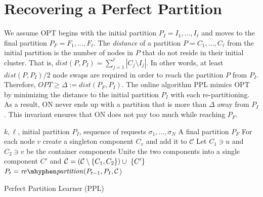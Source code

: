 \documentclass[manuscript,screen=true]{acmart}
\newcommand{\OPT}{\mathit{OPT}}
\DeclarePairedDelimiter\set{\{}{\}}
\begin{document}
\section{Recovering a Perfect Partition}	\label{sec:upperbound}
     
We assume OPT begins with the initial partition
$P_I = I_1, \dots, I_{\ell}$ and moves to the final partition
$P_F = F_1, \dots, F_{\ell}$.
 The \emph{distance} of a partition $P = C_1, \dots, C_{\ell}$ from the initial partition is the number of nodes in $P$ that do not reside in their initial cluster.
    That is,
    $\mathit{dist}(P, P_I) = \sum_{j=1}^{\ell} | C_j \setminus I_j |$. 
In other words,
at least $\mathit{dist}(P, P_I)/2$ node swaps are required in order to reach the partition $P$ from $P_I$.
Therefore,
$\OPT \geq \Delta:= dist(P_F, P_I) $.
The online algorithm PPL mimics OPT by minimizing the distance to the initial partition $P_I$ with each re-partitioning.
As a result,
ON never ends up with a partition that is more than $\Delta$ away from $P_I$.
This invariant ensures that ON does not pay too much while reaching $P_F$.


\begin{algorithm}
    \renewcommand{\algorithmicrequire}{\textbf{Input:}}
    \renewcommand{\algorithmicensure}{\textbf{Output:}}
    \begin{algorithmic}[1]
        \Require 
        $k, \ell$,
        initial partition $P_I$,
        sequence of  requests $\sigma_1, \dots, \sigma_N$ 
        \Ensure A final partition $P_F$ 
        \State For each node $v$ create a singleton component $C_v$ and add it to $\mathcal{C}$
         \label{line:initcomponents}
        \State Let $C_1 \ni u$ and $C_2 \ni v$ be the container components
        \State Unite the two components into a single component $C'$ and
        $\mathcal{C} = (\mathcal{C}\setminus\set{C_1, C_2}) \cup ~\set{C'}$ \label{line:mergecomponents}
        \State $P_{t} = \mathit{re\mhyphen partition}(P_{t-1}, P_I, \mathcal{C}$) \label{line:rebalance} 
        \EndIf
        \EndIf
        \EndFor
    \end{algorithmic}
    \caption{Perfect Partition Learner (PPL)}
    \label{alg:ppl}
      \end{algorithm}
  
\end{document}
